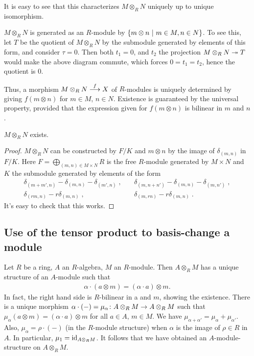 \documentclass[a4paper,parskip=half,numbers=enddot, DIV=12, headheight=30pt]{scrreprt}
\begin{document}
\begin{rem}
    \begin{alphanumerate}
        \item 
            It is easy to see that this characterizes $M\otimes_R N$ uniquely up to unique isomorphism.
        \item 
            $M\otimes_R N$ is generated as an $R$-module by $\left\{m\otimes n \ \middle|\  m\in M, n\in N\right\}$. To see this, let $T$ be the quotient of $M\otimes_RN$ by the submodule generated by elements of this form, and consider $\tau = 0$. Then both $t_1=0$, and $t_2$ the projection $M\otimes_R N \epimorphism T$ would make the above diagram commute, which forces $0=t_1=t_2$, hence the quotient is $0$. 
            
            Thus, a morphism $M\otimes_R N \morphism[f] X$ of $R$-modules is uniquely determined by giving $f(m\otimes n)$ for $m\in M$, $n\in N$. Existence is guaranteed by the universal property, provided that the expression given for $f(m\otimes n)$ is bilinear in $m$ and $n$.
    \end{alphanumerate}
\end{rem}
\begin{prop}
    $M\otimes_R N$ exists.
\end{prop}
\begin{proof}
    $M\otimes_R N$ can be constructed by $F/K$ and $m\otimes n$ by the image of $\delta_{(m,n)}$ in $F/K$. Here $F=\bigoplus_{(m,n)\in M\times N}R$ is the free $R$-module generated by $M\times N$ and $K$ the submodule generated by elements of the form 
    \begin{align*}
        \delta_{(m+m',n)}-\delta_{(m,n)}-\delta_{(m',n)}\;,\quad&\delta_{(m,n+n')}-\delta_{(m,n)}-\delta_{(m,n')}\;,\\
        \delta_{(rm,n)}-r\delta_{(m,n)}\;,\quad&\delta_{(m,rn)}-r\delta_{(m,n)}\;.
    \end{align*}
    It's easy to check that this works.
\end{proof}
\subsection{Use of the tensor product to basis-change a module}
Let $R$ be a ring, $A$ an $R$-algebra, $M$ an $R$-module. Then $A\otimes_RM$ has a unique structure of an $A$-module such that
\begin{align*}
    \alpha\cdot (a\otimes m) = (\alpha \cdot a)\otimes m.
\end{align*}
In fact, the right hand side is $R$-bilinear in a and $m$, showing the existence. There is a unique morphism $\alpha\cdot(-) = \mu_\alpha\colon A\otimes_R M \morphism A\otimes_R M$ such that $\mu_\alpha(a\otimes m) = (\alpha\cdot a) \otimes m$ for all $a\in A$, $m\in M$. We have $\mu_{\alpha+\alpha'} = \mu_{\alpha}+\mu_{\alpha'}$. Also, $\mu_\alpha = \rho\cdot(-)$ (in the $R$-module structure) when $\alpha$ is the image of $\rho\in R$ in $A$. In particular, $\mu_1 = \operatorname{id}_{A\otimes_R M}$. It follows that we have obtained an $A$-module-structure on $A\otimes_R M$.
\end{document}
